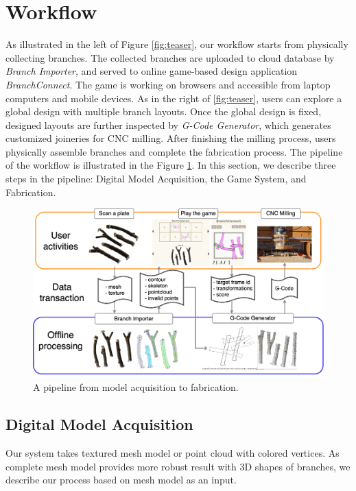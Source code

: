 \section{Workflow}
As illustrated in the left of Figure \ref{fig:teaser}, our workflow starts from physically collecting branches.
The collected branches are uploaded to cloud database by \textit{Branch Importer}, and served to online game-based design application \textit{BranchConnect}.
The game is working on browsers and accessible from laptop computers and mobile devices.
As in the right of \ref{fig:teaser}, users can explore a global design with multiple branch layouts.
Once the global design is fixed, designed layouts are further inspected by \textit{G-Code Generator}, which generates customized joineries for CNC milling.
After finishing the milling process, users physically assemble branches and complete the fabrication process.
The pipeline of the workflow is illustrated in the Figure \ref{fig:pipeline}.
In this section, we describe three steps in the pipeline: Digital Model Acquisition, the Game System, and Fabrication.

\begin{figure}[ht]
  \begin{center}
    \includegraphics[width = 0.4\paperwidth]{images/workflow/pipeline.png}
    \caption{A pipeline from model acquisition to fabrication.}
    \label{fig:pipeline}
  \end{center}
\end{figure}

\subsection{Digital Model Acquisition}
Our system takes textured mesh model or point cloud with colored vertices.
As complete mesh model provides more robust result with 3D shapes of branches, we describe our process based on mesh model as an input.

